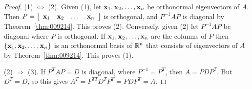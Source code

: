 \begin{proof}
(1) $\Leftrightarrow$ (2). Given (1), let $\textbf{x}_{1}, \textbf{x}_{2}, \dots, \textbf{x}_{n}$ be orthonormal eigenvectors of $A$. Then $P = \left[ \begin{array}{cccc} 
\textbf{x}_{1} & \textbf{x}_{2} & \dots & \textbf{x}_{n}
\end{array}\right]$ is orthogonal, and $P^{-1}AP$ is diagonal by Theorem~\ref{thm:009214}. This proves (2). Conversely, given (2) let $P^{-1}AP$ be diagonal where $P$ is orthogonal. If $\textbf{x}_{1}, \textbf{x}_{2}, \dots, \textbf{x}_{n}$ are the columns of $P$ then $\{\textbf{x}_{1}, \textbf{x}_{2}, \dots, \textbf{x}_{n}\}$ is an orthonormal basis of $\mathbb{R}^n$ that consists of eigenvectors of $A$ by Theorem~\ref{thm:009214}. This proves (1).

(2) $\Rightarrow$ (3). If $P^{T}AP = D$ is diagonal, where $P^{-1} = P^{T}$, then $A = PDP^{T}$. But $D^{T} = D$, so this gives $A^{T} = P^{TT}D^{T}P^{T} = PDP^{T} = A$.


\end{proof}
